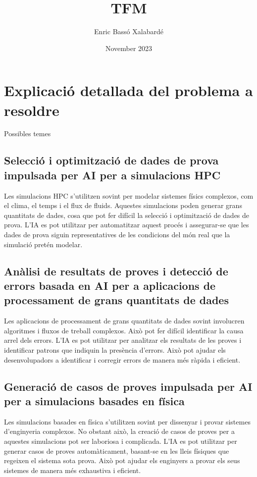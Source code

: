 \documentclass[a4paper, 12pt, left=1.5cm, right=1.5cm, top=1.5cm, bottom=1.5cm]{article}
\title{TFM}
\author{Enric Bassó Xalabardé}
\date{November 2023}
\begin{document}
\maketitle
\tableofcontents

\section{Explicació detallada del problema a resoldre}
Possibles temes
\subsection{Selecció i optimització de dades de prova impulsada per AI per a simulacions HPC}
Les simulacions HPC s'utilitzen sovint per modelar sistemes físics complexos, com el clima, el temps i el flux de fluids. Aquestes simulacions poden generar grans quantitats de dades, cosa que pot fer difícil la selecció i optimització de dades de prova. L'IA es pot utilitzar per automatitzar aquest procés i assegurar-se que les dades de prova siguin representatives de les condicions del món real que la simulació pretén modelar.

\subsection{Anàlisi de resultats de proves i detecció de errors basada en AI per a aplicacions de processament de grans quantitats de dades}
Les aplicacions de processament de grans quantitats de dades sovint involucren algoritmes i fluxos de treball complexos. Això pot fer difícil identificar la causa arrel dels errors. L'IA es pot utilitzar per analitzar els resultats de les proves i identificar patrons que indiquin la presència d'errors. Això pot ajudar els desenvolupadors a identificar i corregir errors de manera més ràpida i eficient.

\subsection{Generació de casos de proves impulsada per AI per a simulacions basades en física}
Les simulacions basades en física s'utilitzen sovint per dissenyar i provar sistemes d'enginyeria complexos. No obstant això, la creació de casos de proves per a aquestes simulacions pot ser laboriosa i complicada. L'IA es pot utilitzar per generar casos de proves automàticament, basant-se en les lleis físiques que regeixen el sistema sota prova. Això pot ajudar els enginyers a provar els seus sistemes de manera més exhaustiva i eficient.
\end{document}
